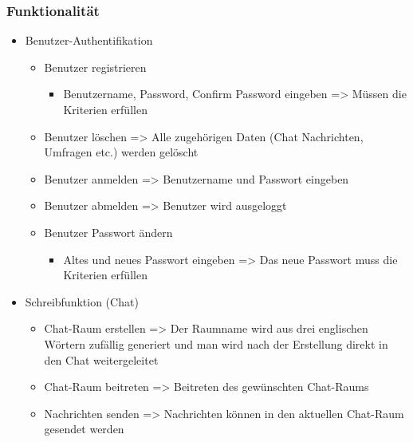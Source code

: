 \subsubsection{Funktionalität}
\begin{itemize}
  \item Benutzer-Authentifikation
  \begin{itemize}
    \item Benutzer registrieren
    \begin{itemize}
      \item Benutzername, Password, Confirm Password eingeben
      \newline 
      => Müssen die Kriterien erfüllen
    \end{itemize}
    \item Benutzer löschen
    \newline
    => Alle zugehörigen Daten (Chat Nachrichten, Umfragen etc.) werden gelöscht
    \item Benutzer anmelden
    \newline
    => Benutzername und Passwort eingeben
    \item Benutzer abmelden
    \newline
    => Benutzer wird ausgeloggt
    \item Benutzer Passwort ändern
    \begin{itemize}
      \item Altes und neues Passwort eingeben
      \newline
      => Das neue Passwort muss die Kriterien erfüllen
    \end{itemize}
  \end{itemize}
  \item Schreibfunktion (Chat)
    \begin{itemize}
      \item Chat-Raum erstellen
      \newline
      => Der Raumname wird aus drei englischen Wörtern zufällig generiert und man wird nach der Erstellung direkt in den Chat weitergeleitet
      \item Chat-Raum beitreten
      \newline
      => Beitreten des gewünschten Chat-Raums
      \item Nachrichten senden
      \newline
      => Nachrichten können in den aktuellen Chat-Raum gesendet werden

\end{itemize}
\end{itemize}
